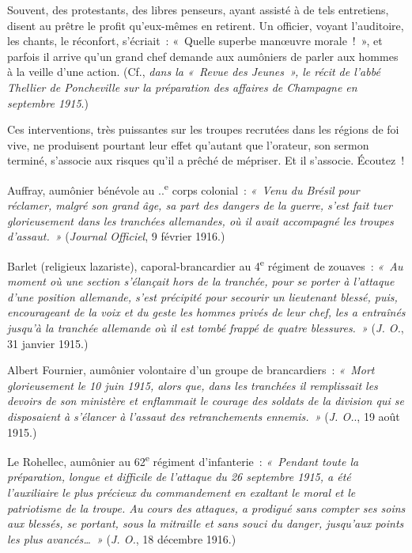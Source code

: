 \documentclass[french,twoside]{book} %
\begin{document}
Souvent, des protestants, des libres penseurs, ayant assisté à de tels entretiens, disent au prêtre le profit qu’eux-mêmes en retirent. Un officier, voyant l’auditoire, les chants, le réconfort, s’écriait : « Quelle superbe manœuvre morale ! », et parfois il arrive qu’un grand chef demande aux aumôniers de parler aux hommes à la veille d’une action. (Cf., {\itshape dans la « Revue des Jeunes », le récit de l’abbé Thellier de Poncheville sur la préparation des affaires de Champagne en septembre 1915}.)‌\par
Ces interventions, très puissantes sur les troupes recrutées dans les régions de foi vive, ne produisent pourtant leur effet qu’autant que l’orateur, son sermon terminé, s’associe aux risques qu’il a prêché de mépriser. Et il s’associe. Écoutez !‌\par
Auffray, aumônier bénévole au ..\textsuperscript{e} corps colonial : \emph{« Venu du Brésil pour réclamer, malgré son grand âge, sa part des dangers de la guerre, s’est fait tuer glorieusement dans les tranchées allemandes, où il avait accompagné les troupes d’assaut. »} ({\itshape Journal Officiel}, 9 février 1916.)‌\par
Barlet (religieux lazariste), caporal-brancardier au 4\textsuperscript{e} régiment de zouaves : \emph{« Au moment où une section s’élançait hors de la tranchée, pour se porter à l’attaque d’une position allemande, s’est précipité pour secourir un lieutenant blessé, puis, encourageant de la voix et du geste les hommes privés de leur chef, les a entraînés jusqu’à la tranchée allemande où il est tombé frappé de quatre blessures. »} ({\itshape J. O.}, 31 janvier 1915.)‌\par
Albert Fournier, aumônier volontaire d’un groupe de brancardiers : \emph{« Mort glorieusement le 10 juin 1915, alors que, dans les tranchées il remplissait les devoirs de son ministère et enflammait le courage des soldats de la division qui se disposaient à s’élancer à l’assaut des retranchements ennemis. »} ({\itshape J. O.}., 19 août 1915.)‌\par
Le Rohellec, aumônier au 62\textsuperscript{e} régiment d’infanterie : \emph{« Pendant toute la préparation, longue et difficile de l’attaque du 26 septembre 1915, a été l’auxiliaire le plus précieux du commandement en exaltant le moral et le patriotisme de la troupe. Au cours des attaques, a prodigué sans compter ses soins aux blessés, se portant, sous la mitraille et sans souci du danger, jusqu’aux points les plus avancés… »} ({\itshape J. O.}, 18 décembre 1916.)‌\par
\end{document}
